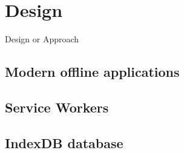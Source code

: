 \chapter{Design}
\label{Design}

Design or Approach

\section{Modern offline applications}
\section{Service Workers}
\section{IndexDB database}